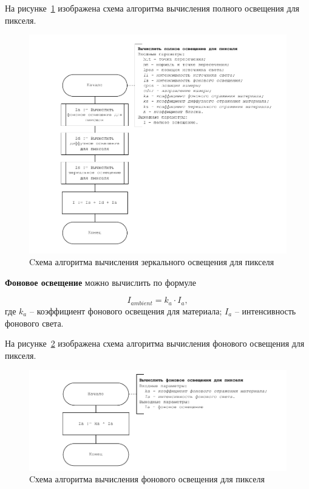 На рисунке~\ref{fig:phong} изображена схема алгоритма вычисления полного освещения для пикселя.

\begin{figure}[ht!]
	\begin{center}
		\includegraphics[scale=1.05]{diag/main-phong.pdf}
	\end{center}
	\caption{Cхема алгоритма вычисления зеркального освещения для пикселя}
	\label{fig:phong}
\end{figure}

\textbf{Фоновое освещение} можно вычислить по формуле

\begin{equation}
	I_{ambient} = k_a \cdot I_a,
\end{equation} где \( k_a \) -- коэффициент фонового освещения для материала; \( I_a \) -- интенсивность фонового света.

На рисунке~\ref{fig:phong-ambient} изображена схема алгоритма вычисления фонового освещения для пикселя.

\begin{figure}[ht!]
	\begin{center}
		\includegraphics[scale=1.0]{diag/main-phong-ambient.pdf}
	\end{center}
	\caption{Cхема алгоритма вычисления фонового освещения для пикселя}
	\label{fig:phong-ambient}
\end{figure}

